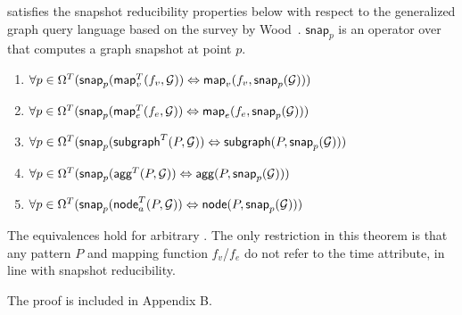 \begin{theorem}
\label{theo:reduce}
\tga satisfies the snapshot reducibility properties below with respect
to the generalized graph query language based on the survey by
Wood~\cite{Wood2012}.  $\textsf{snap}_p$ is an operator over \tgs that
computes a graph snapshot at point $p$.

\begin{enumerate}[itemindent=\dimexpr\labelwidth+\labelsep\relax,leftmargin=7pt]
\item $\forall p \in \Omega^T (\textsf{snap}_p(\textsf{map}^T_v(f_v,\mathcal{G})) \Leftrightarrow \textsf{map}_v(f_v,\textsf{snap}_p(\mathcal{G})))$

\item $\forall p \in \Omega^T (\textsf{snap}_p(\textsf{map}^T_e(f_e,\mathcal{G})) \Leftrightarrow \textsf{map}_e(f_e,\textsf{snap}_p(\mathcal{G})))$

\item $\forall p \in \Omega^T (\textsf{snap}_p(\textsf{subgraph}^T(P,\mathcal{G})) \Leftrightarrow \textsf{subgraph}(P,\textsf{snap}_p(\mathcal{G})))$

\item $\forall p \in \Omega^T (\textsf{snap}_p(\textsf{agg}^T(P,\mathcal{G})) \Leftrightarrow \textsf{agg}(P,\textsf{snap}_p(\mathcal{G})))$

\item $\forall p \in \Omega^T (\textsf{snap}_p(\textsf{node}^T_a(P,\mathcal{G})) \Leftrightarrow \textsf{node}(P,\textsf{snap}_p(\mathcal{G})))$


\end{enumerate}

The equivalences hold for arbitrary \tgs.  The only restriction in
this theorem is that any pattern $P$ and mapping function $f_v$/$f_e$
do not refer to the time attribute, in line with snapshot reducibility.
\end{theorem}

The proof is included in Appendix B.

